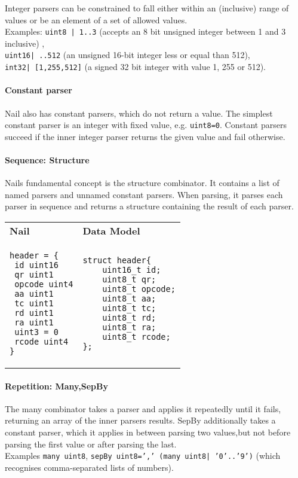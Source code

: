 Integer parsers can be constrained to fall either within an (inclusive) range of values or be an
element of a set of allowed values. \\
Examples: \texttt{uint8 | 1..3} (accepts an 8 bit unsigned
integer between 1 and 3 inclusive) ,\\
 \texttt{uint16| ..512} (an unsigned 16-bit integer less or
equal than 512),\\
\texttt{int32| [1,255,512]} (a signed 32 bit integer with value 1, 255 or 512). 

\paragraph{Constant parser}
Nail also has constant parsers, which do not return a value. The simplest constant parser is an
integer with fixed value, e.g. \texttt{uint8=0}. Constant parsers succeed if the inner integer
parser returns the given value and fail otherwise. 


\paragraph{Sequence: Structure}
Nails fundamental concept is the structure combinator. It contains a list of
named parsers and unnamed constant parsers. When parsing, it parses each parser
in sequence and returns a structure containing the result of each parser.

\begin{tabular}{ll}
\textbf{Nail} & \textbf{Data Model}\\
\begin{minipage}{2in}
\begin{verbatim}
header = {
 id uint16
 qr uint1
 opcode uint4
 aa uint1 
 tc uint1
 rd uint1
 ra uint1
 uint3 = 0
 rcode uint4
}
\end{verbatim} 
\end{minipage}
 & 
\begin{minipage}{2in}
\begin{verbatim}
struct header{
    uint16_t id;
    uint8_t qr;
    uint8_t opcode;
    uint8_t aa;
    uint8_t tc;
    uint8_t rd;
    uint8_t ra;
    uint8_t rcode;
};
\end{verbatim} 
\end{minipage} 
\\
\end{tabular}
\paragraph{Repetition: Many,SepBy}
The many combinator takes a parser and applies it repeatedly until it fails, returning an array of
the inner parsers results. SepBy additionally takes a constant parser, which it applies in between
parsing two values,but not before parsing the first value or after parsing the last.\\
Examples \texttt{many uint8}, \texttt{sepBy uint8=',' (many uint8| '0'..'9')} (which recognises
comma-separated lists of numbers).

